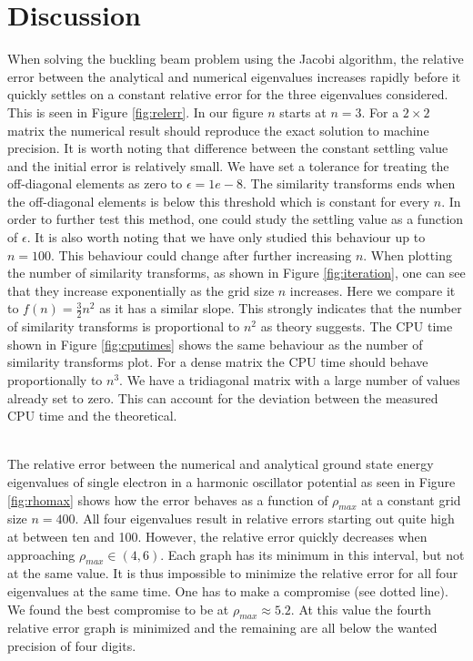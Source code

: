 \documentclass[twocolumn]{aastex62}
\begin{document}
\section{Discussion} \label{sec:discussion}
When solving the buckling beam problem using the Jacobi algorithm, the relative error between the analytical and numerical eigenvalues increases rapidly before it quickly settles on a constant relative error for the three eigenvalues considered. This is seen in Figure \ref{fig:relerr}. In our figure $n$ starts at $n=3$. For a $2\times2$ matrix the numerical result should reproduce the exact solution to machine precision. It is worth noting that difference between the constant settling value and the initial error is relatively small. We have set a tolerance for treating the off-diagonal elements as zero to $\epsilon=1e-8$.  The similarity transforms ends when the off-diagonal elements is below this threshold which is constant for every $n$. In order to further test this method, one could study the settling value as a function of $\epsilon$. It is also worth noting that we have only studied this behaviour up to $n=100$. This behaviour could change after further increasing $n$.
	When plotting the number of similarity transforms, as shown in Figure \ref{fig:iteration}, one can see that they increase exponentially as the grid size $n$ increases. Here we compare it to $f(n) =\frac{3}{2}n^2$ as it has a similar slope. This strongly indicates that the number of similarity transforms is proportional to $n^2$ as theory suggests. The CPU time shown in Figure \ref{fig:cputimes} shows the same behaviour as the number of similarity transforms plot. For a dense matrix the CPU time should behave proportionally to $n^3$. We have a tridiagonal matrix with a large number of values already set to zero. This can account for the deviation between the measured CPU time and the theoretical.\\\\\indent

The relative error between the numerical and analytical ground state energy eigenvalues of single electron in a harmonic oscillator potential as seen in Figure \ref{fig:rhomax} shows how the error behaves as a function of $\rho_{max}$ at a constant grid size $n = 400$. All four eigenvalues result in relative errors starting out quite high at between ten and 100. However, the relative error quickly decreases when approaching $\rho_{max}\in(4,6)$. Each graph has its minimum in this interval, but not at the same value. It is thus impossible to minimize the relative error for all four eigenvalues at the same time. One has to make a compromise (see dotted line). We found the best compromise to be at $\rho_{max}\approx 5.2$. At this value the fourth relative error graph is minimized and the remaining are all below the wanted precision of four digits. 
\end{document}
